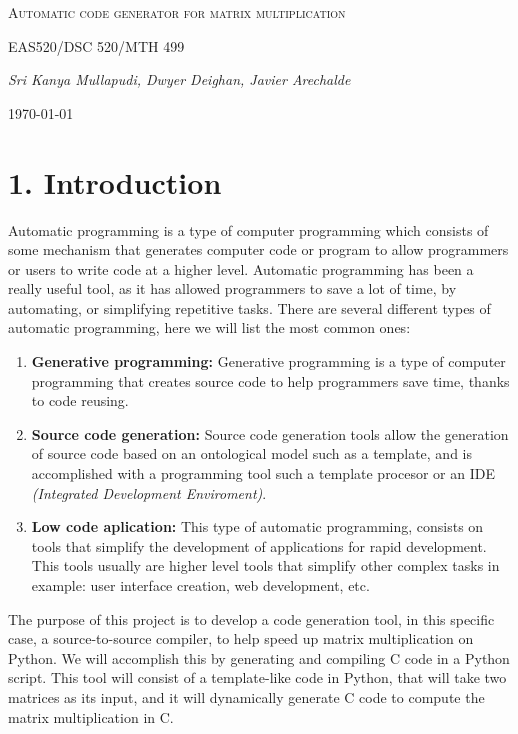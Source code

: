 \documentclass{article}
\begin{document}
\begin{titlepage}
	\centering
	{\scshape\LARGE Automatic code generator for matrix multiplication \par}
	\vspace{1cm}
	{\scshape\Large EAS520/DSC 520/MTH 499\par}
	\vspace{1.5cm}
	{\Large\itshape Sri Kanya Mullapudi, Dwyer Deighan, Javier Arechalde\par}
	\vfill
	{\large \today\par}
\end{titlepage}

\section*{1. Introduction}

Automatic programming is a type of computer programming which consists of some mechanism that generates computer code or program to allow programmers or users to write code at a higher level. Automatic programming has been a really useful tool, as it has allowed programmers to save a lot of time, by automating, or simplifying repetitive tasks. There are several different types of automatic programming, here we will list the most common ones:

\begin{enumerate}
 \item{\textbf{Generative programming:}}
 Generative programming is a type of computer programming that creates source code to help programmers save time, thanks to code reusing.
 \item{\textbf{Source code generation:}}
 Source code generation tools allow the generation of source code based on an ontological model such as a template, and is accomplished with a programming tool such a template procesor or an IDE \textit{(Integrated Development Enviroment)}.
 \item{\textbf{Low code aplication:}}
 This type of automatic programming, consists on tools that simplify the development of applications for rapid development. This tools usually are higher level tools that simplify other complex tasks in example: user interface creation, web development, etc.
\end{enumerate}

The purpose of this project is to develop a code generation tool, in this specific case, a source-to-source compiler, to help speed up matrix multiplication on Python. We will accomplish this by generating and compiling C code in a Python script. This tool will consist of a template-like code in Python, that will take two matrices as its input, and it will dynamically generate C code to compute the matrix multiplication in C.
\end{document}
